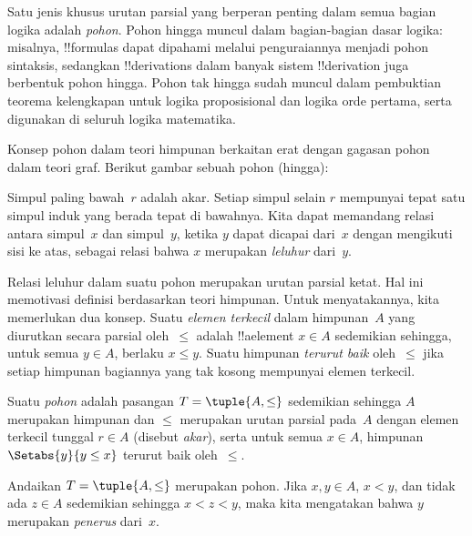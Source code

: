 \documentclass[../../../include/open-logic-section]{subfiles}
\begin{document}

Satu jenis khusus urutan parsial yang berperan penting dalam semua bagian
logika adalah \emph{pohon}. Pohon hingga muncul dalam bagian-bagian dasar
logika: misalnya, !!{formula}s dapat dipahami melalui penguraiannya menjadi
pohon sintaksis, sedangkan !!{derivation}s dalam banyak sistem
!!{derivation} juga berbentuk pohon hingga.
%
Pohon tak hingga sudah muncul dalam pembuktian teorema kelengkapan untuk
logika proposisional dan logika orde pertama, serta digunakan di seluruh
logika matematika.

Konsep pohon dalam teori himpunan berkaitan erat dengan gagasan pohon dalam
teori graf. Berikut gambar sebuah pohon (hingga):

\begin{center}
\end{center}

Simpul paling bawah~$r$ adalah akar. Setiap simpul selain $r$ mempunyai tepat
satu simpul induk yang berada tepat di bawahnya. Kita dapat memandang relasi
antara simpul~$x$ dan simpul~$y$, ketika $y$ dapat dicapai dari~$x$ dengan
mengikuti sisi ke atas, sebagai relasi bahwa $x$ merupakan \emph{leluhur}
dari~$y$.

Relasi leluhur dalam suatu pohon merupakan urutan parsial ketat. Hal ini
memotivasi definisi berdasarkan teori himpunan. Untuk menyatakannya, kita
memerlukan dua konsep. Suatu \emph{elemen terkecil} dalam himpunan~$A$ yang
diurutkan secara parsial oleh~$\le$ adalah !!a{element} $x \in A$ sedemikian
sehingga, untuk semua $y \in A$, berlaku $x \le y$. Suatu himpunan
\emph{terurut baik}
oleh~$\le$ jika setiap himpunan bagiannya yang tak kosong mempunyai elemen
terkecil.

\begin{defn}[Pohon]
Suatu \emph{pohon} adalah pasangan $T = \tuple{A, \le}$ sedemikian sehingga
$A$ merupakan himpunan dan $\le$ merupakan urutan parsial pada~$A$ dengan
elemen terkecil tunggal $r \in A$ (disebut \emph{akar}), serta untuk semua
$x \in A$, himpunan $\Setabs{y}{y \le x}$ terurut baik oleh~$\le$.
\end{defn}

\begin{defn}[Penerus]
Andaikan $T = \tuple{A, \le}$ merupakan pohon. Jika $x,y \in A$, $x < y$,
dan tidak ada $z \in A$ sedemikian sehingga $x < z < y$, maka kita mengatakan
bahwa $y$ merupakan \emph{penerus} dari~$x$.
\end{defn}
\end{document}
